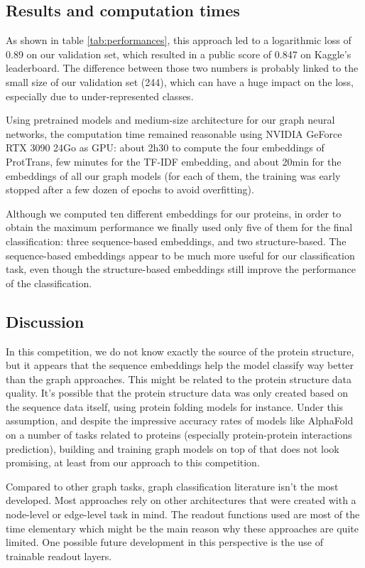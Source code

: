 \documentclass[final]{cvpr}
\begin{document}
\subsection{Results and computation times}

As shown in table \ref{tab:performances}, this approach led to a logarithmic loss of 0.89 on our validation set, which resulted in a public  score of 0.847 on Kaggle's leaderboard. The difference between those two numbers is probably linked to the small size of our validation set (244), which can have a huge impact on the loss, especially due to under-represented classes.

Using pretrained models and medium-size architecture for our graph neural networks, the computation time remained reasonable using NVIDIA GeForce RTX 3090 24Go as GPU: about 2h30 to compute the four embeddings of ProtTrans, few minutes for the TF-IDF embedding, and about 20min for the embeddings of all our graph models (for each of them, the training was early stopped after a few dozen of epochs to avoid overfitting).

Although we computed ten different embeddings for our proteins, in order to obtain the maximum performance we finally used only five of them for the final classification: three sequence-based embeddings, and two structure-based. The sequence-based embeddings appear to be much more useful for our classification task, even though the structure-based embeddings still improve the performance of the classification.

\subsection{Discussion}

 In this competition, we do not know exactly the source of the protein structure, but it appears that the sequence embeddings help the model classify way better than the graph approaches. This might be related to the protein structure data quality. It's possible that the protein structure data was only created based on the sequence data itself, using protein folding models for instance. Under this assumption, and despite the impressive accuracy rates of models like AlphaFold \cite{Jumper2021} on a number of tasks related to proteins (especially protein-protein interactions prediction), building and training graph models on top of that does not look promising, at least from our approach to this competition. 

 Compared to other graph tasks, graph classification literature isn't the most developed. Most approaches rely on other architectures that were created with a node-level or edge-level task in mind. The readout functions used are most of the time elementary which might be the main reason why these approaches are quite limited. One possible future development in this perspective is the use of trainable readout layers. 
\end{document}
